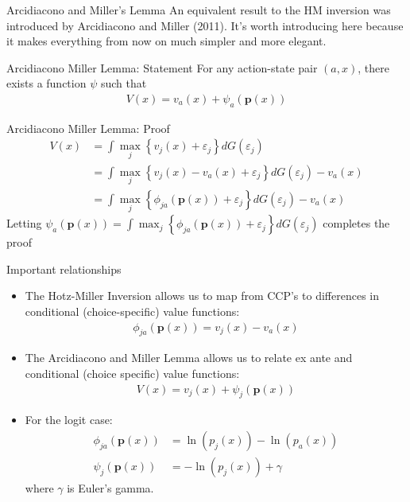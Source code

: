 \documentclass[xcolor=pdftex,dvipsnames,table,mathserif,aspectratio=169]{beamer}
\begin{document}
\begin{frame}{Arcidiacono and Miller's Lemma}
An equivalent result to the HM inversion was introduced by Arcidiacono and Miller (2011). 
It's worth introducing here because it makes everything from now on much simpler
and more elegant.
\begin{block}{Arcidiacono Miller Lemma: Statement}
For any action-state pair $\left(a,x\right)$, there exists a function
$\psi$ such that 
\begin{align*}
V\left(x\right)=v_{a}\left(x\right)+\psi_{a}\left(\mathbf{p}\left(x\right)\right)
\end{align*}
\end{block}
\end{frame}

\begin{frame}{Arcidiacono Miller Lemma: Proof}
\begin{align*}
V\left(x\right) &=  \int\max_{j}\left\{ v_{j}\left(x\right)+\varepsilon_{j}\right\} dG\left(\varepsilon_{j}\right)\\
 &= \int\max_{j}\left\{ v_{j}\left(x\right)-v_{a}\left(x\right)+\varepsilon_{j}\right\} dG\left(\varepsilon_{j}\right)-v_{a}\left(x\right)\\
 &=  \int\max_{j}\left\{ \phi_{ja}\left(\mathbf{p}\left(x\right)\right)+\varepsilon_{j}\right\} dG\left(\varepsilon_{j}\right)-v_{a}\left(x\right)
\end{align*}
Letting $\psi_{a}\left(\mathbf{p}\left(x\right)\right)=\int\max_{j}\left\{ \phi_{ja}\left(\mathbf{p}\left(x\right)\right)+\varepsilon_{j}\right\} dG\left(\varepsilon_{j}\right)$ completes the proof
\end{frame}

\begin{frame}{Important relationships}
\small
\begin{itemize}
\item The Hotz-Miller Inversion allows us to map from CCP's to differences
in conditional (choice-specific) value functions:
\begin{align*}
\phi_{ja}\left(\mathbf{p}\left(x\right)\right)=v_{j}\left(x\right)-v_{a}\left(x\right)
\end{align*}
\item The Arcidiacono and Miller Lemma allows us to relate ex ante and conditional (choice specific)
value functions: 
\begin{align*}
V\left(x\right)=v_{j}\left(x\right)+\psi_{j}\left(\mathbf{p}\left(x\right)\right)
\end{align*}
\item For the logit case:
\begin{align*}
\phi_{ja}\left(\mathbf{p}\left(x\right)\right) & = \ln\left(p_{j}\left(x\right)\right)-\ln\left(p_{a}\left(x\right)\right)\\
\psi_{j}\left(\mathbf{p}\left(x\right)\right) & =  -\ln\left(p_{j}\left(x\right)\right)+\gamma
\end{align*}
where $\gamma$ is Euler's gamma.
\end{itemize}
\end{frame}
\end{document}
